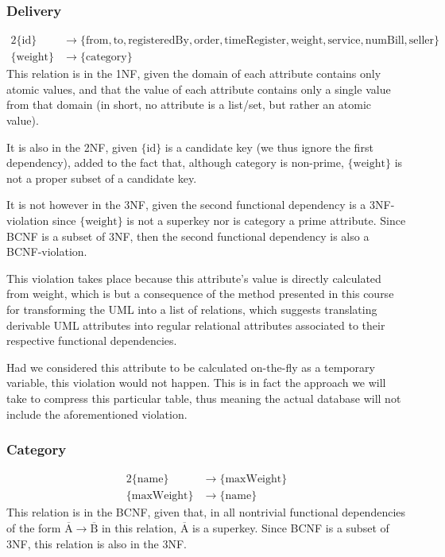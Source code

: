 \documentclass{report}[a4paper]
\theoremstyle{remark}
\begin{document}
\subsubsection{Delivery}
\begin{alignat*}{2}
\{\text{id}\} &\rightarrow \{\text{from},\text{to},\text{registeredBy},\text{order},\text{timeRegister},\text{weight},\text{service},\text{numBill},\text{seller}\} \\
\{\text{weight}\} &\rightarrow \{\text{category}\}
\end{alignat*}
This relation is in the 1NF, given the domain of each attribute contains only atomic values, and that the value of each attribute contains only a single value from that domain (in short, no attribute is a list/set, but rather an atomic value).\par
It is also in the 2NF, given $\{\text{id}\}$ is a candidate key (we thus ignore the first dependency), added to the fact that, although category is non-prime, $\{\text{weight}\}$ is not a proper subset of a candidate key. \par
It is not however in the 3NF, given the second functional dependency is a 3NF-violation since $\{\text{weight}\}$ is not a superkey nor is category a prime attribute. Since BCNF is a subset of 3NF, then the second functional dependency is also a BCNF-violation.\par
This violation takes place because this attribute's value is directly calculated from weight, which is but a consequence of the method presented in this course for transforming the UML into a list of relations, which suggests translating derivable UML attributes into regular relational attributes associated to their respective functional dependencies. \par
Had we considered this attribute to be calculated on-the-fly as a temporary variable, this violation would not happen. This is in fact the approach we will take to compress this particular table, thus meaning the actual database will not include the aforementioned violation.
\subsubsection{Category}
\begin{alignat*}{2}
\{\text{name}\} & \rightarrow \{\text{maxWeight}\} \\
\{\text{maxWeight}\} & \rightarrow \{\text{name}\}
\end{alignat*}
This relation is in the BCNF, given that, in all nontrivial functional dependencies of the form $\overline{\text{A}} \rightarrow \overline{\text{B}}$ in this relation, $\overline{\text{A}}$ is a superkey. Since BCNF is a subset of 3NF, this relation is also in the 3NF.
\end{document}
